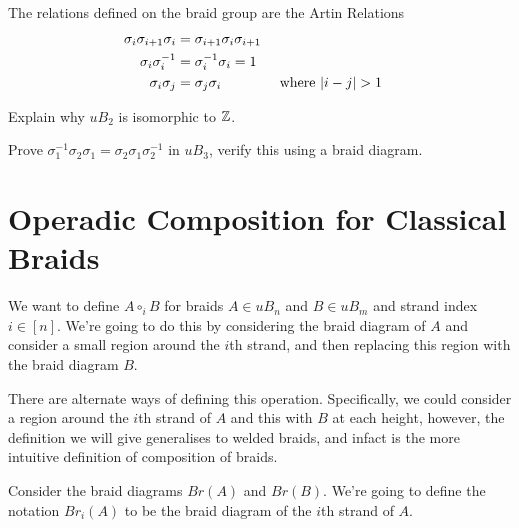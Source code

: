 \begin{Definition}
The relations defined on the braid group are the Artin Relations
\begin{alignat*}{3}
    \sigma_i\sigma_{i + 1}\sigma_i &= \sigma_{i + 1}\sigma_i\sigma_{i + 1} \\
    \sigma_i \sigma_i^{-1} &= \sigma_i^{-1} \sigma_i = 1 \\
    \sigma_i\sigma_j &= \sigma_j \sigma_i &&\text{ where \( |i - j| > 1\)}
\end{alignat*}
\end{Definition}

\begin{Exercise}
    Explain why \( \mathit{uB}_2 \) is isomorphic to \( \mathbb{Z} \).
\end{Exercise}
\begin{Exercise}
    Prove \( \sigma_1^{-1} \sigma_2 \sigma_1 = \sigma_2 \sigma_1 \sigma_2^{-1} \) in \( \mathit{uB}_3 \), verify this using a braid diagram.
\end{Exercise}

\section{Operadic Composition for Classical Braids}


We want to define \( A \circ_i B \) for braids \( A \in uB_n \) and \( B \in uB_m \) and strand index \( i \in [n] \). 
We're going to do this by considering the braid diagram of \( A \) and consider a small region around the \( i \)th strand, and then replacing this region with the braid diagram \( B \).

There are alternate ways of defining this operation.
Specifically, we could consider a region around the \( i \)th strand of \( A \) and this with \( B \) at each height, however, the definition we will give generalises to welded braids, and infact is the more intuitive definition of composition of braids. 

Consider the  braid diagrams \( Br(A) \) and \( Br(B) \).
We're going to define the notation \( Br_i(A) \) to be the braid diagram of the \( i \)th strand of \( A \). 

